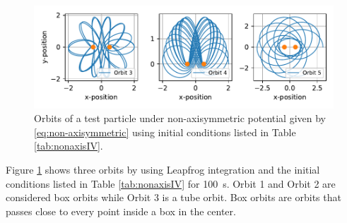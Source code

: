 \begin{figure}[htb!]
    \centering
    \includegraphics{CodeAndFigures/NonAxisSymetricOrbits.pdf}
    \caption{Orbits of a test particle under non-axisymmetric potential given by \ref{eq:non-axisymmetric} using initial conditions listed in Table \ref{tab:nonaxisIV}.}
    \label{fig:nonaxisOrbits}
\end{figure}

Figure \ref{fig:nonaxisOrbits} shows three orbits by using Leapfrog integration and the initial conditions listed in Table \ref{tab:nonaxisIV} for \SI{100}{\s}. Orbit 1 and Orbit 2 are considered box orbits while Orbit 3 is a tube orbit. 
Box orbits are orbits that passes close to every point inside a box in the center. 


\subsection{}





\clearpage